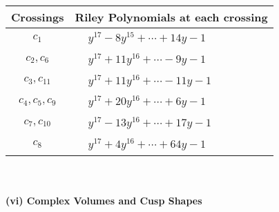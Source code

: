 \documentclass[1p]{elsarticle_modified}
\theoremstyle{definition}
\begin{document}
\begin{tabular}{m{50pt}|m{274pt}}
Crossings & \hspace{64pt}Riley Polynomials at each crossing \\
\hline $$\begin{aligned}c_{1}\end{aligned}$$&$\begin{aligned}
&y^{17}-8 y^{15}+\cdots+14 y-1
\end{aligned}$\\
\hline $$\begin{aligned}c_{2},c_{6}\end{aligned}$$&$\begin{aligned}
&y^{17}+11 y^{16}+\cdots-9 y-1
\end{aligned}$\\
\hline $$\begin{aligned}c_{3},c_{11}\end{aligned}$$&$\begin{aligned}
&y^{17}+11 y^{16}+\cdots-11 y-1
\end{aligned}$\\
\hline $$\begin{aligned}c_{4},c_{5},c_{9}\end{aligned}$$&$\begin{aligned}
&y^{17}+20 y^{16}+\cdots+6 y-1
\end{aligned}$\\
\hline $$\begin{aligned}c_{7},c_{10}\end{aligned}$$&$\begin{aligned}
&y^{17}-13 y^{16}+\cdots+17 y-1
\end{aligned}$\\
\hline $$\begin{aligned}c_{8}\end{aligned}$$&$\begin{aligned}
&y^{17}+4 y^{16}+\cdots+64 y-1
\end{aligned}$\\
\hline
\end{tabular}\\~\\
\newpage\flushleft \textbf{(vi) Complex Volumes and Cusp Shapes}
\end{document}

